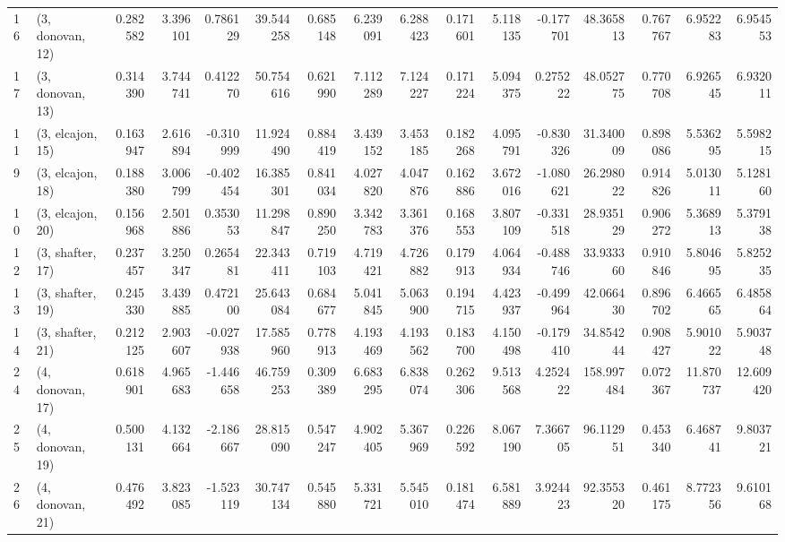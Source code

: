 \begin{tabular}{llrrrrrrrrrrrrrr}
16 &  (3, donovan, 12) &   0.282582 &  3.396101 &  0.786129 &  39.544258 &  0.685148 &   6.239091 &  6.288423 &  0.171601 &   5.118135 & -0.177701 &   48.365813 &  0.767767 &   6.952283 &   6.954553 \\
17 &  (3, donovan, 13) &   0.314390 &  3.744741 &  0.412270 &  50.754616 &  0.621990 &   7.112289 &  7.124227 &  0.171224 &   5.094375 &  0.275222 &   48.052775 &  0.770708 &   6.926545 &   6.932011 \\
11 &  (3, elcajon, 15) &   0.163947 &  2.616894 & -0.310999 &  11.924490 &  0.884419 &   3.439152 &  3.453185 &  0.182268 &   4.095791 & -0.830326 &   31.340009 &  0.898086 &   5.536295 &   5.598215 \\
9  &  (3, elcajon, 18) &   0.188380 &  3.006799 & -0.402454 &  16.385301 &  0.841034 &   4.027820 &  4.047876 &  0.162886 &   3.672016 & -1.080621 &   26.298022 &  0.914826 &   5.013011 &   5.128160 \\
10 &  (3, elcajon, 20) &   0.156968 &  2.501886 &  0.353053 &  11.298847 &  0.890250 &   3.342783 &  3.361376 &  0.168553 &   3.807109 & -0.331518 &   28.935129 &  0.906272 &   5.368913 &   5.379138 \\
12 &  (3, shafter, 17) &   0.237457 &  3.250347 &  0.265481 &  22.343411 &  0.719103 &   4.719421 &  4.726882 &  0.179913 &   4.064934 & -0.488746 &   33.933360 &  0.910846 &   5.804695 &   5.825235 \\
13 &  (3, shafter, 19) &   0.245330 &  3.439885 &  0.472100 &  25.643084 &  0.684677 &   5.041845 &  5.063900 &  0.194715 &   4.423937 & -0.499964 &   42.066430 &  0.896702 &   6.466565 &   6.485864 \\
14 &  (3, shafter, 21) &   0.212125 &  2.903607 & -0.027938 &  17.585960 &  0.778913 &   4.193469 &  4.193562 &  0.183700 &   4.150498 & -0.179410 &   34.854244 &  0.908427 &   5.901022 &   5.903748 \\
24 &  (4, donovan, 17) &   0.618901 &  4.965683 & -1.446658 &  46.759253 &  0.309389 &   6.683295 &  6.838074 &  0.262306 &   9.513568 &  4.252422 &  158.997484 &  0.072367 &  11.870737 &  12.609420 \\
25 &  (4, donovan, 19) &   0.500131 &  4.132664 & -2.186667 &  28.815090 &  0.547247 &   4.902405 &  5.367969 &  0.226592 &   8.067190 &  7.366705 &   96.112951 &  0.453340 &   6.468741 &   9.803721 \\
26 &  (4, donovan, 21) &   0.476492 &  3.823085 & -1.523119 &  30.747134 &  0.545880 &   5.331721 &  5.545010 &  0.181474 &   6.581889 &  3.924423 &   92.355320 &  0.461175 &   8.772356 &   9.610168 \\

\end{tabular}
